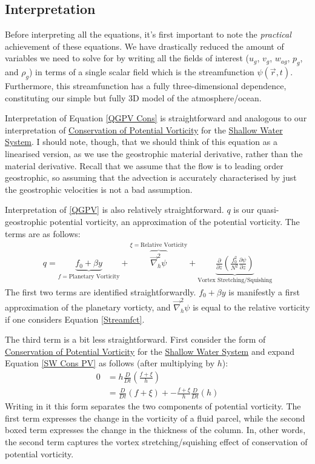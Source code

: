 \subsection{Interpretation}

Before interpreting all the equations, it's first important to note the \textit{practical} achievement of these equations. We have drastically reduced the amount of variables we need to solve for by writing all the fields of interest ($u_g$, $v_g$, $w_{ag}$, $p_g$, and $\rho_g$) in terms of a single scalar field which is the streamfunction $\psi(\vec{r},t)$. Furthermore, this streamfunction has a fully three-dimensional dependence, constituting our simple but fully 3D model of the atmosphere/ocean. 

Interpretation of Equation \ref{QGPV Cons} is straightforward and analogous to our interpretation of \hyperref[Cons PV Box]{Conservation of Potential Vorticity} for the \hyperref[Shallow Water System]{Shallow Water System}. I should note, though, that we should think of this equation as a linearised version, as we use the geostrophic material derivative, rather than the material derivative. Recall that we assume that the flow is to leading order geostrophic, so assuming that the advection is accurately characterised by just the geostrophic velocities is not a bad assumption.

Interpretation of \ref{QGPV} is also relatively straightforward. $q$ is our quasi-geostrophic potential vorticity, an approximation of the potential vorticity. The terms are as follows:
\begin{align*}
    q = \underbrace{f_0 + \beta y}_{f=\text{Planetary Vorticity}}
    +
    \overbrace{\vec{\nabla}_h^2 \psi}^{\xi=\text{Relative Vorticity}}
    +\underbrace{\frac{\partial }{\partial z}\left( \frac{f_0^2}{N^2} \frac{\partial \psi}{\partial z} \right)}_\text{Vortex Stretching/Squishing}
\end{align*}
The first two terms are identified straightforwardly. $f_0+\beta y$ is manifestly a first approximation of the planetary vorticty, and $\vec{\nabla}_h^2\psi$ is equal to the relative vorticity if one considers Equation \ref{Streamfct}. 

The third term is a bit less straightforward. First consider the form of \hyperref[Cons PV Box]{Conservation of Potential Vorticity} for the \hyperref[Shallow Water System]{Shallow Water System} and expand Equation \ref{SW Cons PV} as follows (after multiplying by $h$):
\begin{align*}
    0&=h\frac{D}{Dt}\left( \frac{f+\xi}{h} \right)
    \\
    &=
    \frac{D}{Dt}(f+\xi) + \boxed{-\frac{f+\xi}{h}\frac{D}{Dt}(h)}
\end{align*}
Writing in it this form separates the two components of potential vorticity. The first term expresses the change in the vorticity of a fluid parcel, while the second boxed term expresses the change in the thickness of the column. In, other words, the second term captures the vortex stretching/squishing effect of conservation of potential vorticity.

